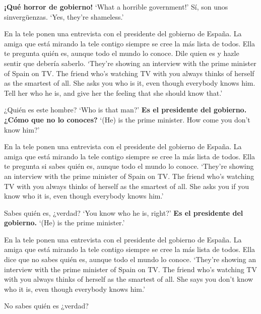 \begin{exe}
\begin{xlist}[A:]
	 \textbf{¡Qué horror de gobierno!} 
	\glt `What a horrible government!' 
	 Sí, son unos sinvergüenzas. \href{https://osf.io/uz4dc/}{\faVolumeUp}
	\glt `Yes, they're shameless.' 
	\end{xlist}
\ex \label{ex:experimentoOBVDECLgobierno_APP}
	En la tele ponen una entrevista con el presidente del gobierno de España. La amiga que está mirando la tele contigo siempre se cree la más lista de todos. Ella te pregunta quién es, aunque todo el mundo lo conoce. Dile quien es y hazle sentir que debería saberlo. 
	\glt `They're showing an interview with the prime minister of Spain on TV. The friend who's watching TV with you always thinks of herself as the smartest of all. She asks you who is it, even though everybody knows him. Tell her who he is, and give her the feeling that she should know that.' 
	\begin{xlist}[A:]
	 ¿Quién es este hombre? \href{https://osf.io/zan4g/}{\faVolumeUp}
	\glt `Who is that man?' 
	 \textbf{Es el presidente del gobierno. ¿Cómo que no lo conoces?} 
	\glt `(He) is the prime minister. How come you don't know him?' 
	\end{xlist}
\ex \label{ex:experimentoOBVCONFgobierno_APP}
	En la tele ponen una entrevista con el presidente del gobierno de España. La amiga que está mirando la tele contigo siempre se cree la más lista de todos. Ella te pregunta si sabes quién es, aunque todo el mundo lo conoce.
	\glt `They're showing an interview with the prime minister of Spain on TV. The friend who's watching TV with you always thinks of herself as the smartest of all. She asks you if you know who it is, even though everybody knows him.' 
	\begin{xlist}[A:]
	 Sabes quién es, ¿verdad? \href{https://osf.io/qjt98/}{\faVolumeUp}
	\glt `You know who he is, right?' 
	 \textbf{Es el presidente del gobierno.} 
	\glt `(He) is the prime minister.' 
	\end{xlist}
\ex \label{ex:experimentoOBVDENgobierno_APP}
	En la tele ponen una entrevista con el presidente del gobierno de España. La amiga que está mirando la tele contigo siempre se cree la más lista de todos. Ella dice que no sabes quién es, aunque todo el mundo lo conoce. 
	\glt `They're showing an interview with the prime minister of Spain on TV. The friend who's watching TV with you always thinks of herself as the smartest of all. She says you don't know who it is, even though everybody knows him.' 
	\begin{xlist}[A:]
	 No sabes quién es ¿verdad? \href{https://osf.io/3mxry/}{\faVolumeUp}

\end{xlist}
\end{exe}
